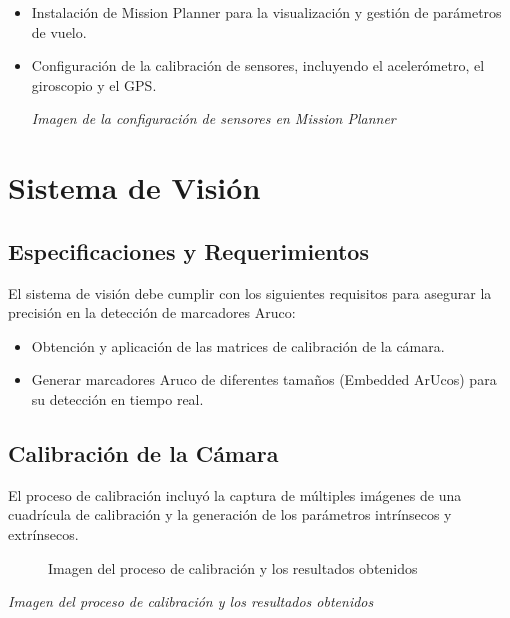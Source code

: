     \begin{itemize} 
        \item Instalación de Mission Planner para la visualización y gestión de parámetros de vuelo. 
        \item Configuración de la calibración de sensores, incluyendo el acelerómetro, el giroscopio y el GPS. 
        \begin{center} 
            \textit{Imagen de la configuración de sensores en Mission Planner} 
        \end{center} 
    \end{itemize}

\section{Sistema de Visión}
\subsection{Especificaciones y Requerimientos} 
El sistema de visión debe cumplir con los siguientes requisitos para asegurar la precisión en la detección de marcadores Aruco:
    \begin{itemize}
        \item Obtención y aplicación de las matrices de calibración de la cámara.
        \item Generar marcadores Aruco de diferentes tamaños (Embedded ArUcos) para su detección en tiempo real.
    \end{itemize}

\subsection{Calibración de la Cámara} El proceso de calibración incluyó la captura de múltiples imágenes de una cuadrícula de calibración y la generación de los parámetros intrínsecos y extrínsecos.

    \begin{center} 
        \figurename{
            \begin{figure}
                \centering
                \caption{Imagen del proceso de calibración y los resultados obtenidos}
            \end{figure}
        }
        
        \textit{Imagen del proceso de calibración y los resultados obtenidos} 
    \end{center}

